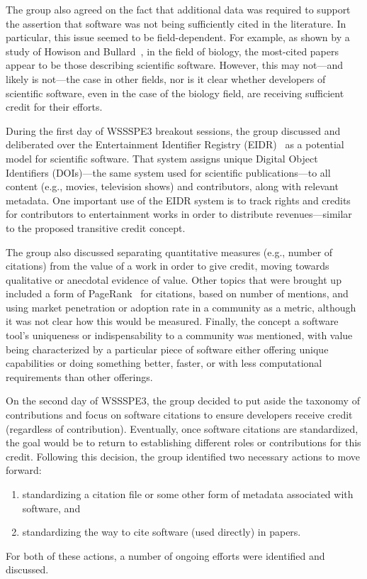 The group also agreed on the fact that additional data was required to support
the assertion that software was not being sufficiently cited in the literature.
In particular, this issue seemed to be field-dependent. For example, as shown by
a study of Howison and Bullard~\cite{Howison2015}, in the field of biology, the
most-cited papers appear to be those describing scientific software. However,
this may not---and likely is not---the case in other fields, nor is it clear
whether developers of scientific software, even in the case of the biology
field, are receiving sufficient credit for their efforts.

During the first day of WSSSPE3 breakout sessions, the group discussed and deliberated over the
Entertainment Identifier Registry (EIDR)~\cite{EIDR} as a potential model for
scientific software. That system assigns unique Digital Object Identifiers
(DOIs)---the same system used for scientific publications---to all content
(e.g., movies, television shows) and contributors, along with relevant metadata.
One important use of the EIDR system is to track rights and credits for contributors
to entertainment works in order to distribute revenues---similar to the proposed
transitive credit concept.

The group also discussed separating quantitative measures (e.g., number of
citations) from the value of a work in order to give credit, moving towards
qualitative or anecdotal evidence of value. Other topics that were brought up included a
form of PageRank~\cite{Brin1998} for citations, based on number of mentions, and
using market penetration or adoption rate in a community as a metric, although
it was not clear how this would be measured. Finally, the concept a software
tool's uniqueness or indispensability to a community was mentioned, with value
being characterized by a particular piece of software either offering unique
capabilities or doing something better, faster, or with less computational
requirements than other offerings.

On the second day of WSSSPE3, the group decided to put aside the
taxonomy of contributions and focus on software citations to ensure developers
receive credit (regardless of contribution). Eventually, once 
software citations are standardized, the goal would be to return to establishing different
roles or contributions for this credit. Following this decision, the group
identified two necessary actions to move forward:
\begin{enumerate}

\item standardizing a citation file or some other form of metadata associated
with software, and

\item standardizing the way to cite software (used directly) in papers.
        
\end{enumerate}
For both of these actions, a number of ongoing efforts were identified and discussed.

